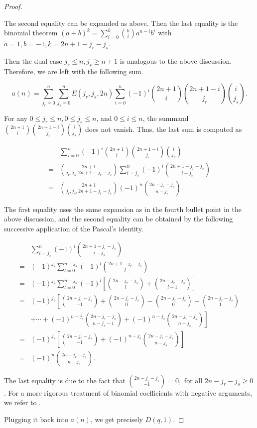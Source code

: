 \documentclass[11pt]{article}
\begin{document}
\begin{proof}
\begin{itemize}
    The second equality can be expanded as above. Then the last equality is the binomial theorem \((a + b)^k = \sum_{i=0}^k\binom{k}{i}a^{n-i}b^i\) with \(a=1, b=-1, k=2n+1-j_r-j_s\). 
\end{itemize}

Then the dual case \(j_r\leq n, j_s\geq n + 1\) is analogous to the above discussion. Therefore, we are left with the following sum. 

\[
a(n) = \sum_{j_r = 0}^{n}\sum_{j_s = 0}^{n}E(j_r, j_s, 2n)\sum_{i = 0}^n(-1)^i\binom{2n+1}{i}\binom{2n+1-i}{j_r}\binom{i}{j_s}.
\]

For any \(0\leq j_r\leq n, 0\leq j_s\leq n\), and \(0\leq i\leq n\), the summand \(\binom{2n+1}{i}\binom{2n+1-i}{j_r}\binom{i}{j_s}\) does not vanish. Thus, the last sum is computed as 

\begin{align*}
    &\sum_{i = 0}^n(-1)^i\binom{2n+1}{i}\binom{2n+1-i}{j_r}\binom{i}{j_s}\\ 
    =&\binom{2n + 1}{j_r, j_s, 2n + 1 - j_r - j_s}\sum_{i = j_s}^n(-1)^i\binom{2n + 1 - j_r - j_s}{i - j_s}\\ 
    =&\binom{2n + 1}{j_r, j_s, 2n + 1 - j_r - j_s}(-1)^n\binom{2n - j_r - j_s}{n - j_r}.
\end{align*}

The first equality uses the same expansion as in the fourth bullet point in the above discussion, and the second equality can be obtained by the following successive application of the Pascal's identity. 

\begin{align*}
    &\sum_{i = j_s}^n(-1)^i\binom{2n + 1 - j_r - j_s}{i - j_s}\\
    =&(-1)^{j_s}\sum_{l = 0}^{n - j_s}(-1)^l\binom{2n + 1 - j_r - j_s}{l}\\ 
    =&(-1)^{j_s}\sum_{l = 0}^{n - j_s}(-1)^l\left[\binom{2n - j_r - j_s}{l} + \binom{2n - j_r - j_s}{l-1}\right]\\ 
    =&(-1)^{j_s}\left[\binom{2n - j_r - j_s}{-1} + \binom{2n - j_r - j_s}{0} - \binom{2n - j_r - j_s}{0} - \binom{2n - j_r - j_s}{1}\right. \\ 
    &\left.+ \cdots + (-1)^{n-j_s}\binom{2n - j_r - j_s}{n - j_s - 1} + (-1)^{n - j_s}\binom{2n - j_r - j_s}{n - j_s}\right]\\ 
    =&(-1)^{j_s}\left[\binom{2n - j_r - j_s}{-1} + (-1)^{n - j_s}\binom{2n - j_r - j_s}{n - j_s}\right]\\ 
    =&(-1)^n\binom{2n - j_r - j_s}{n - j_s}.
\end{align*}

The last equality is due to the fact that \(\binom{2n - j_r - j_s}{-1} = 0, \text{ for all } 2n - j_r - j_s\geq 0\). For a more rigorous treatment of binomial coefficients with negative arguments, we refer to \cite{graham1989concrete}. 

Plugging it back into \(a(n)\), we get precisely \(D(q, 1)\). 
\end{proof}
\end{document}
